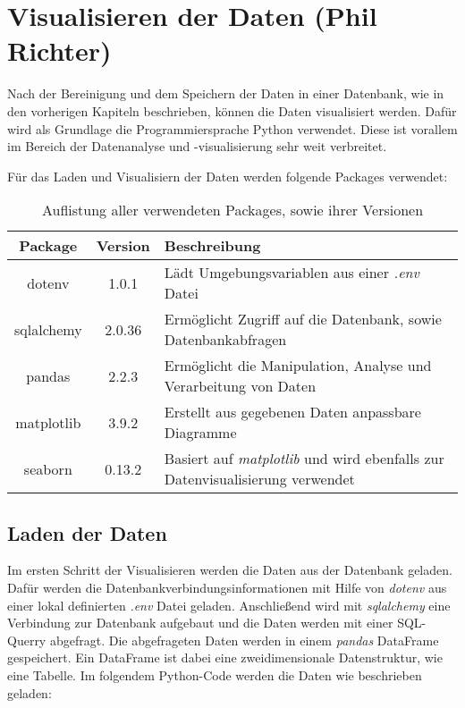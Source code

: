 \chapter{Visualisieren der Daten (Phil Richter)}
Nach der Bereinigung und dem Speichern der Daten in einer Datenbank, wie in den vorherigen Kapiteln beschrieben, können die Daten visualisiert werden. Dafür wird als Grundlage
die Programmiersprache Python verwendet. Diese ist vorallem im Bereich der Datenanalyse und -visualisierung sehr weit verbreitet.

Für das Laden und Visualisiern der Daten werden folgende Packages verwendet:
\begin{table}[h!]
    \centering
    \begin{tabularx}{\textwidth}{|c|c|>{\centering\arraybackslash}X|}
        \hline
        \textbf{Package} & \textbf{Version} & \textbf{Beschreibung} \\ \hline
        dotenv & 1.0.1 & Lädt Umgebungsvariablen aus einer \textit{.env} Datei \\ \hline
        sqlalchemy & 2.0.36 & Ermöglicht Zugriff auf die Datenbank, sowie Datenbankabfragen \\ \hline
        pandas & 2.2.3 & Ermöglicht die Manipulation, Analyse und Verarbeitung von Daten \\ \hline
        matplotlib & 3.9.2 & Erstellt aus gegebenen Daten anpassbare Diagramme \\ \hline
        seaborn & 0.13.2 & Basiert auf \textit{matplotlib} und wird ebenfalls zur Datenvisualisierung verwendet \\ \hline
    \end{tabularx}
    \caption{Auflistung aller verwendeten Packages, sowie ihrer Versionen}
\end{table}

\section{Laden der Daten}
Im ersten Schritt der Visualisieren werden die Daten aus der Datenbank geladen. Dafür werden die Datenbankverbindungsinformationen mit Hilfe von \textit{dotenv}
aus einer lokal definierten \textit{.env} Datei geladen. Anschließend wird mit \textit{sqlalchemy} eine Verbindung zur Datenbank aufgebaut und die Daten werden 
mit einer SQL-Querry abgefragt. Die abgefrageten Daten werden in einem \textit{pandas} DataFrame gespeichert. Ein DataFrame ist dabei eine zweidimensionale Datenstruktur,
wie eine Tabelle. Im folgendem Python-Code werden die Daten wie beschrieben geladen:

